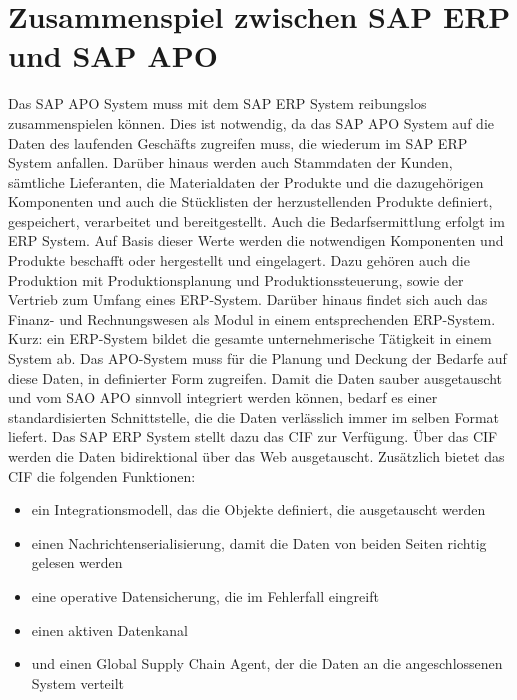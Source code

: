 \section{Zusammenspiel zwischen SAP ERP und SAP APO}
Das SAP \ac{APO} System muss mit dem SAP \ac{ERP} System reibungslos zusammenspielen können. Dies ist notwendig, da das SAP \ac{APO} System auf die Daten des laufenden Geschäfts zugreifen muss, die wiederum im SAP ERP System anfallen. Darüber hinaus werden auch Stammdaten der Kunden, sämtliche Lieferanten, die Materialdaten der Produkte und die dazugehörigen Komponenten und auch die Stücklisten der herzustellenden Produkte definiert, gespeichert, verarbeitet und bereitgestellt. Auch die Bedarfsermittlung erfolgt im ERP System. Auf Basis dieser Werte werden die notwendigen Komponenten und Produkte beschafft oder hergestellt und eingelagert. Dazu gehören auch die Produktion mit Produktionsplanung und Produktionssteuerung, sowie der Vertrieb zum Umfang eines ERP-System. Darüber hinaus findet sich auch das Finanz- und Rechnungswesen als Modul in einem entsprechenden ERP-System. Kurz: ein ERP-System bildet die gesamte unternehmerische Tätigkeit in einem System ab.
Das \ac{APO}-System muss für die Planung und Deckung der Bedarfe auf diese Daten, in definierter Form zugreifen. Damit die Daten sauber ausgetauscht und vom SAO \ac{APO} sinnvoll integriert werden können, bedarf es einer standardisierten Schnittstelle, die die Daten verlässlich immer im selben Format liefert. Das SAP \ac{ERP} System stellt dazu das \ac{CIF} zur Verfügung. Über das \ac{CIF} werden die Daten  bidirektional über das Web ausgetauscht. Zusätzlich bietet das \ac{CIF} die folgenden Funktionen: \cite[Abschnitt 4.4, Seite 1 ff]{scm:script_17_1}
\begin{itemize}
	\item ein Integrationsmodell, das die Objekte definiert, die ausgetauscht werden
	\item einen Nachrichtenserialisierung, damit die Daten von beiden Seiten richtig gelesen werden 
	\item eine operative Datensicherung, die im Fehlerfall eingreift
	\item einen aktiven Datenkanal
	\item und einen Global Supply Chain Agent, der die Daten an die angeschlossenen System verteilt
\end{itemize}

